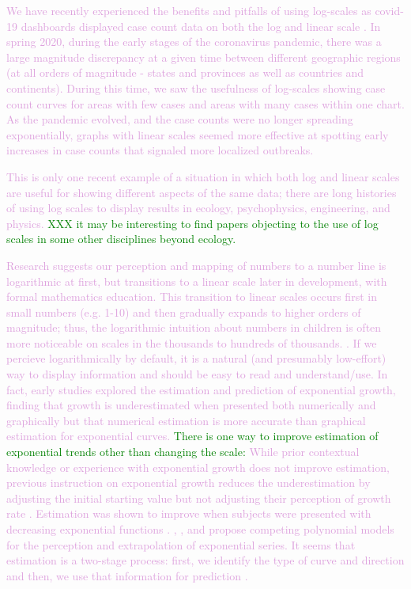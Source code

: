 \documentclass[]{interact}
\theoremstyle{plain}%
\theoremstyle{definition}
\theoremstyle{remark}
\begin{document}
\textcolor{Plum}{We have recently experienced the benefits and pitfalls of using log-scales as covid-19 dashboards displayed case count data on both the log and linear scale \citep{wade_fagen_ulmschneider_2020}. 
In spring 2020, during the early stages of the coronavirus pandemic, there was a large magnitude discrepancy at a given time between different geographic regions (at all orders of magnitude - states and provinces as well as countries and continents). 
During this time, we saw the usefulness of log-scales showing case count curves for areas with few cases and areas with many cases within one chart.
As the pandemic evolved, and the case counts were no longer spreading exponentially, graphs with linear scales seemed more effective at spotting early increases in case counts that signaled more localized outbreaks.
}

\textcolor{Plum}{
This is only one recent example of a situation in which both log and linear scales are useful for showing different aspects of the same data; there are long histories of using log scales to display results in ecology, psychophysics, engineering, and physics. 
\citep{xkcd}
}
\textcolor{Green}{XXX it may be interesting to find papers objecting to the use of log scales in some other disciplines beyond ecology.}

\textcolor{Plum}{
Research suggests our perception and mapping of numbers to a number line is logarithmic at first, but transitions to a linear scale later in development, with formal mathematics education.
This transition to linear scales occurs first in small numbers (e.g. 1-10) and then gradually expands to higher orders of magnitude; thus, the logarithmic intuition about numbers in children is often more noticeable on scales in the thousands to hundreds of thousands. \citep{varshney_why_2013, siegler_numerical_2017, dehaeneLogLinearDistinct2008}.
If we percieve logarithmically by default, it is a natural (and presumably low-effort) way to display information and should be easy to read and understand/use.}
\textcolor{Plum}{In fact, early studies explored the estimation and prediction of exponential growth, finding that growth is underestimated when presented both numerically and graphically but that numerical estimation is more accurate than graphical estimation for exponential curves.}
\textcolor{Green}{There is one way to improve estimation of exponential trends other than changing the scale:}
\textcolor{Plum}{While prior contextual knowledge or experience with exponential growth does not improve estimation, previous instruction on exponential growth reduces the underestimation by adjusting the initial starting value but not adjusting their perception of growth rate
\citep{wagenaar_misperception_1975, jones_polynomial_1977}.
Estimation was shown to improve when subjects were presented with decreasing exponential functions \citep{timmers_inverse_1977}.
\cite{jones_polynomial_1977}, \cite{wagenaar_extrapolation_1978}, and \cite{jones_generalized_1979} propose competing polynomial models for the perception and extrapolation of exponential series.
It seems that estimation is a two-stage process: first, we identify the type of curve and direction and then, we use that information for prediction \citep{best_perception_2007}.
}
\end{document}
